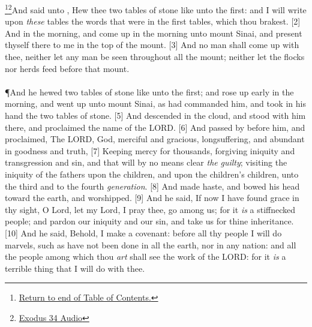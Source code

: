 \footnote{\textcolor[cmyk]{0.99998,1,0,0}{\hyperlink{TOC}{Return to end of Table of Contents.}}}\footnote{\href{https://audiobible.com/bible/exodus_34.html}{\textcolor[cmyk]{0.99998,1,0,0}{Exodus 34 Audio}}}\textcolor[cmyk]{0.99998,1,0,0}{And  said unto , Hew thee two tables of stone like unto the first: and I will write upon \emph{these} tables the words that were in the first tables, which thou brakest.}
[2] \textcolor[cmyk]{0.99998,1,0,0}{And  in the morning, and come up in the morning unto mount Sinai, and present thyself there to me in the top of the mount.}
[3] \textcolor[cmyk]{0.99998,1,0,0}{And no man shall come up with thee, neither let any man be seen throughout all the mount; neither let the flocks nor herds feed before that mount.}\\
\\
\P \textcolor[cmyk]{0.99998,1,0,0}{And he hewed two tables of stone like unto the first; and  rose up early in the morning, and went up unto mount Sinai, as  had commanded him, and took in his hand the two tables of stone.}
[5] \textcolor[cmyk]{0.99998,1,0,0}{And  descended in the cloud, and stood with him there, and proclaimed the name of the LORD.}
[6] \textcolor[cmyk]{0.99998,1,0,0}{And  passed by before him, and proclaimed, The LORD,  God, merciful and gracious, longsuffering, and abundant in goodness and truth,}
[7] \textcolor[cmyk]{0.99998,1,0,0}{Keeping mercy for thousands, forgiving iniquity and transgression and sin, and that will by no means clear \emph{the} \emph{guilty}; visiting the iniquity of the fathers upon the children, and upon the children's children, unto the third and to the fourth \emph{generation}.}
[8] \textcolor[cmyk]{0.99998,1,0,0}{And  made haste, and bowed his head toward the earth, and worshipped.}
[9] \textcolor[cmyk]{0.99998,1,0,0}{And he said, If now I have found grace in thy sight, O Lord, let my Lord, I pray thee, go among us; for it \emph{is} a stiffnecked people; and pardon our iniquity and our sin, and take us for thine inheritance.}
[10] \textcolor[cmyk]{0.99998,1,0,0}{And he said, Behold, I make a covenant: before all thy people I will do marvels, such as have not been done in all the earth, nor in any nation: and all the people among which thou \emph{art} shall see the work of the LORD: for it \emph{is} a terrible thing that I will do with thee.}
